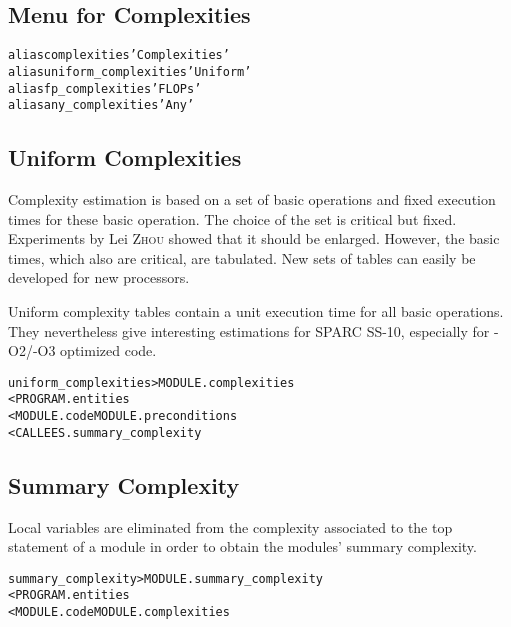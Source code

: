 \documentclass[a4paper]{report}
\newenvironment{PipsMake}{\begin{alltt}}{\end{alltt}}
\newenvironment{PipsPass}[1]{\label{pass:#1}}{}
\begin{document}
\subsection{Menu for Complexities}

\begin{PipsMake}
alias complexities      'Complexities'
alias uniform_complexities      'Uniform'
alias fp_complexities   'FLOPs'
alias any_complexities  'Any'
\end{PipsMake}

\subsection{Uniform Complexities}
\label{subsubsection-uniform-complexities}

\begin{PipsPass}{uniform_complexities}
Complexity estimation is based on a set of basic operations and fixed
execution times for these basic operation. The choice of the set is
critical but fixed. Experiments by Lei \textsc{Zhou} showed that it should be
enlarged. However, the basic times, which also are critical, are
tabulated. New sets of tables can easily be developed for new
processors.

Uniform complexity tables contain a unit execution time for all basic
operations. They nevertheless give interesting estimations for SPARC
SS-10, especially for -O2/-O3 optimized code.
\end{PipsPass}

\begin{PipsMake}
uniform_complexities                    > MODULE.complexities
        < PROGRAM.entities
        < MODULE.code MODULE.preconditions
        < CALLEES.summary_complexity
\end{PipsMake}

\subsection{Summary Complexity}
\label{subsubsection-summary-complexity}

\begin{PipsPass}{summary_complexity}
Local variables are eliminated from the complexity associated to the top
statement of a module in order to obtain the modules' summary complexity.
\end{PipsPass}

\begin{PipsMake}
summary_complexity              > MODULE.summary_complexity
        < PROGRAM.entities
        < MODULE.code MODULE.complexities
\end{PipsMake}
\end{document}
